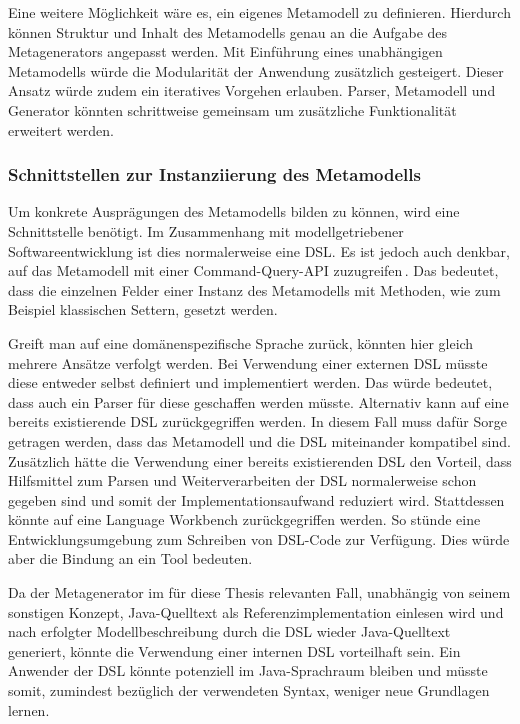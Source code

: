 \documentclass[12pt,oneside,a4paper,parskip]{scrbook}
\begin{document}
Eine weitere Möglichkeit wäre es, ein eigenes Metamodell zu definieren. Hierdurch können Struktur und Inhalt des Metamodells genau an die Aufgabe des Metagenerators angepasst werden. Mit Einführung eines unabhängigen Metamodells würde die Modularität der Anwendung zusätzlich gesteigert. Dieser Ansatz würde zudem ein iteratives Vorgehen erlauben. Parser, Metamodell und Generator könnten schrittweise gemeinsam um zusätzliche Funktionalität erweitert werden.

\subsubsection{Schnittstellen zur Instanziierung des Metamodells}

Um konkrete Ausprägungen des Metamodells bilden zu können, wird eine Schnittstelle benötigt. Im Zusammenhang mit modellgetriebener Softwareentwicklung ist dies normalerweise eine DSL. Es ist jedoch auch denkbar, auf das Metamodell mit einer Command-Query-API zuzugreifen\,\cite[S.\,343ff.]{fowler2010}. Das bedeutet, dass die einzelnen Felder einer Instanz des Metamodells mit Methoden, wie zum Beispiel klassischen Settern, gesetzt werden.

Greift man auf eine domänenspezifische Sprache zurück, könnten hier gleich mehrere Ansätze verfolgt werden. Bei Verwendung einer externen DSL müsste diese entweder selbst definiert und implementiert werden. Das würde bedeutet, dass auch ein Parser für diese geschaffen werden müsste. Alternativ kann auf eine bereits existierende DSL zurückgegriffen werden. In diesem Fall muss dafür Sorge getragen werden, dass das Metamodell und die DSL miteinander kompatibel sind. Zusätzlich hätte die Verwendung einer bereits existierenden DSL den Vorteil, dass Hilfsmittel zum Parsen und Weiterverarbeiten der DSL normalerweise schon gegeben sind und somit der Implementationsaufwand reduziert wird. Stattdessen könnte auf eine Language Workbench zurückgegriffen werden. So stünde eine Entwicklungsumgebung zum Schreiben von DSL-Code zur Verfügung. Dies würde aber die Bindung an ein Tool bedeuten.

Da der Metagenerator im für diese Thesis relevanten Fall, unabhängig von seinem sonstigen Konzept, Java-Quelltext als Referenzimplementation einlesen wird und nach erfolgter Modellbeschreibung durch die DSL wieder Java-Quelltext generiert, könnte die Verwendung einer internen DSL vorteilhaft sein. Ein Anwender der DSL könnte potenziell im Java-Sprachraum bleiben und müsste somit, zumindest bezüglich der verwendeten Syntax, weniger neue Grundlagen lernen.
\end{document}
